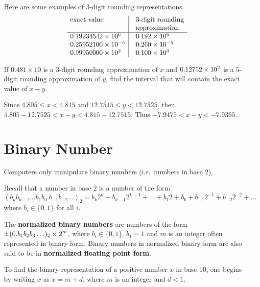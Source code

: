 \begin{egg}
Here are some examples of $3$-digit rounding representations.
\[
\begin{array}{l|@{\hspace{1em}}l}
\text{exact value} & \text{$3$-digit rounding}\\
 & \text{approximation}\\
\hline
0.19234542 \times 10^6 & 0.192 \times 10^6 \\
0.25952100 \times 10^{-5} & 0.260 \times 10^{-5} \\
0.99950000 \times 10^2 & 0.100 \times 10^3
\end{array}
\]
\end{egg}

\begin{egg}
If $0.481\times 10$ is a $3$-digit rounding approximation of $x$ and
$\displaystyle 0.12752 \times 10^2$ is a $5$-digit rounding
approximation of $y$, find
the interval that will contain the exact value of $x-y$.

Since $4.805 \leq x <4.815$ and $12.7515 \leq y < 12.7525$, then
$4.805-12.7525 <x-y < 4.815-12.7515$.  Thus $-7.9475 < x-y < -7.9365$.
\end{egg}

\section{Binary Number}

Computers only manipulate binary numbers (i.e.\ numbers in base $2$),

Recall that a number in base $2$ is a number of the form
\[
(b_k b_{k-1} \ldots b_1 b_0. b_{-1} b_{-2} \ldots )_2
= b_k 2^k + b_{k-1} 2^{k-1} + \ldots + b_1 2 + b_0 + b_{-1} 2^{-1}
+ b_{-2} 2^{-2} + \ldots
\]
where $b_i \in \{0,1\}$ for all $i$.

\begin{defn}
The {\bfseries normalized binary numbers}
are numbers of the form
$\displaystyle \pm(0.b_1 b_2 b_3 \ldots )_2 \times 2^m$, where
$b_i \in \{0,1\}$, 
$b_1 = 1$ and $m$ is an integer often represented in binary form. 
Binary numbers in normalized binary form are also said to be in
{\bfseries normalized floating point form}.
\end{defn}

To find the binary representation of a positive number $x$ in base
$10$, one begins by writing $x$ as $x=m+d$, where $m$ is an integer
and $d<1$.

